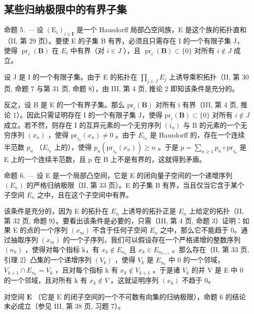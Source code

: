 \subsection{某些归纳极限中的有界子集}

命题 5. --- 设 \((\mathrm{E}_{i})_{i\in\mathbf{I}}\) 是一个 Hausdorff 局部凸空间族，E 是这个族的拓扑直和（II, 第 29 页）。要使 E 的子集 B 有界，必须且只需存在 I 的一个有限子集 J，使得 \(\operatorname{pr}_{i}(\mathbf{B})\) 在 \(E_{i}\) 中有界（对 \(i\in J\) ），且 \(\operatorname{pr}_{i}(\mathbf{B})\subset\{0\}\) 对所有 \(i\notin J\) 成立。

设 J 是 I 的一个有限子集。由于 E 的拓扑在 \(\prod_{j\in J}E_{j}\) 上诱导乘积拓扑（II, 第 30 页, 命题 7 与第 31 页, 命题 8），由 III, 第 4 页, 推论 2 即知该条件是充分的。

反之，设 B 是 E 的一个有界子集。那么 \(\mathrm{pr}_{i}(\mathbf{B})\) 对所有 i 有界（III, 第 4 页, 推论 1）。因此只需证明存在 I 的一个有限子集 J，使得 \(\mathrm{pr}_{i}(\mathbf{B}) \subset \{0\}\) 对所有 \(i \notin J\) 成立。若不然，则存在 I 的互异元素的一个无穷序列 \((i_{n})\) 与 B 的元素的一个无穷序列 \((x_{n})\) ，使得 \(\mathrm{pr}_{i_{n}}(x_{n}) \neq 0\) 。由于 \(E_{i_{n}}\) 是 Hausdorff 的，存在一个连续半范数 \(p_{n}\) （\(E_{i_{n}}\) 上的），使得 \(p_{n}(\mathrm{pr}_{i_{n}}(x_{n})) \geqslant n\) 。于是 \(p = \sum_{n \geqslant 1} p_{n} \circ \mathrm{pr}_{i_{n}}\) 是 E 上的一个连续半范数，且 p 在 B 上不是有界的，这就得到矛盾。

命题 6. --- 设 E 是一个局部凸空间，它是 E 的闭向量子空间的一个递增序列 \((E_{n})\) 的严格归纳极限（II, 第 33 页）。E 的子集 B 有界，当且仅当它含于某个子空间 \(E_{n}\) 之中，且在这个子空间中有界。

该条件是充分的，因为 E 的拓扑在 \(E_{n}\) 上诱导的拓扑正是 \(E_{n}\) 上给定的拓扑（II, 第 32 页, 命题 9）。要看出该条件是必要的，只需（III, 第 4 页, 命题 3）证明：如果 E 的点的一个序列 \((x_{m})\) 不含于任何子空间 \(E_{n}\) 之中，那么它不能趋于 0。通过抽取序列 \((x_{m})\) 的一个子序列，我们可以假设存在一个严格递增的整数序列 \((n_{k})\) ，使得对每个指标 k，有 \(x_{k} \notin E_{n_{k}}\) 且 \(x_{k} \in E_{n_{k+1}}\) 。那么存在（II, 第 33 页, 引理 2）凸集的一个递增序列 \((V_{k})\) ，使得 \(V_{k}\) 是 \(E_{n_{k}}\) 中 0 的一个邻域，\(V_{k+1} \cap E_{n_{k}} = V_{k}\) ，且对每个指标 k 有 \(x_{k} \notin V_{k+1}\) 。于是诸 \(V_{k}\) 的并 V 是 E 中 0 的一个邻域，且对所有 k 有 \(x_{k} \notin V\) 。这就证明序列 \((x_{k})\) 不趋于 0。

对空间 \(\mathbf{E}\) （它是 \(\mathrm{E}\) 的闭子空间的一个不可数有向集的归纳极限），命题 6 的结论未必成立（参见 III, 第 38 页, 习题 7）。

